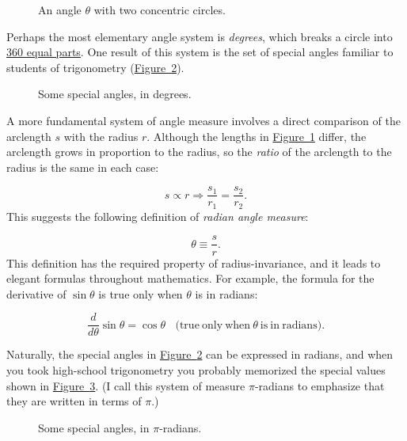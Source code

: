 \documentclass{article}
\begin{document}
\begin{figure}
\begin{center}
\end{center}
\caption{An angle $\theta$ with two concentric circles.\label{fig:angle_arclength}}
\end{figure}

Perhaps the most elementary angle system is \emph{degrees}, which breaks a circle into \href{http://www.wonderquest.com/circle.htm}{360 equal parts}. One result of this system is the set of special angles familiar to students of trigonometry (\hyperref[fig:degree_angles]{Figure~}\ref{fig:degree_angles}). 

\begin{figure}
\begin{center}
\end{center}
\caption{Some special angles, in degrees.\label{fig:degree_angles}}
\end{figure}

A more fundamental system of angle measure involves a direct comparison of the arclength $s$ with the radius $r$. Although the lengths in \hyperref[fig:angle_arclength]{Figure~}\ref{fig:angle_arclength} differ, the arclength grows in proportion to the radius, so the \emph{ratio} of the arclength to the radius is the same in each case:

\[
s\propto r \Rightarrow \frac{s_1}{r_1} = \frac{s_2}{r_2}.
\]
This suggests the following definition of \emph{radian angle measure}:

\[ \theta \equiv \frac{s}{r}. \]
 This definition has the required property of radius-invariance, and it leads to elegant formulas throughout mathematics. For example, the formula for the derivative of $\sin\theta$ is true only when $\theta$ is in radians:

\[
  \frac{d}{d\theta}\sin\theta = \cos\theta \mathrm{\ \ \ \ (true\ only\ when\ } \theta\mathrm{\ is\ in\ radians).}
\]

Naturally, the special angles in \hyperref[fig:degree_angles]{Figure~}\ref{fig:degree_angles} can be expressed in radians, and when you took high-school trigonometry you probably memorized the special values shown in \hyperref[fig:pi_angles]{Figure~}\ref{fig:pi_angles}. (I call this system of measure $\pi$-radians to emphasize that they are written in terms of $\pi$.)

\begin{figure}
\begin{center}
\end{center}
\caption{Some special angles, in $\pi$-radians.\label{fig:pi_angles}}
\end{figure}
\end{document}
